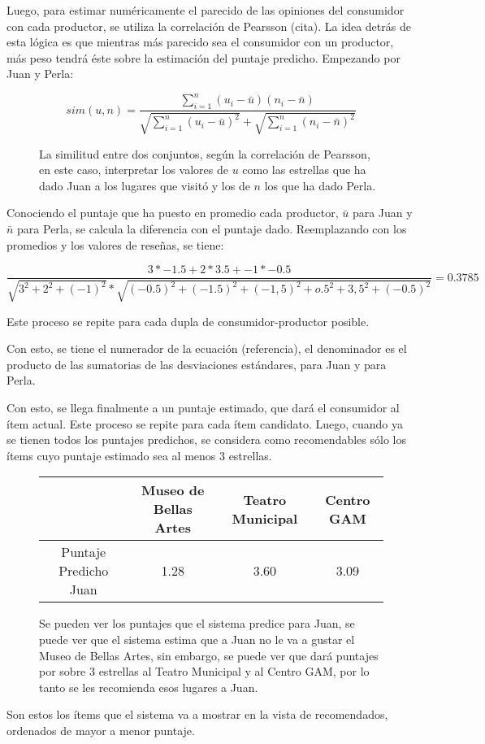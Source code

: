 Luego, para estimar numéricamente el parecido de las opiniones del consumidor con cada productor, se utiliza la correlación de Pearsson (cita). La idea detrás de esta lógica es que mientras más parecido sea el consumidor con un productor, más peso tendrá éste sobre la estimación del puntaje predicho. Empezando por Juan y Perla:

\begin{figure}

\begin{equation}
sim(u,n)=\frac{\sum_{i=1}^{n}(u_i-\bar{u})(n_i-\bar{n})}{\sqrt{\sum_{i=1}^{n}(u_i-\bar{u})^2}+\sqrt{\sum_{i=1}^{n}(n_i-\bar{n})^2}}
\end{equation}
\caption{La similitud entre dos conjuntos, según la correlación de Pearsson, en este caso, interpretar los valores de $u$ como las estrellas que ha dado Juan a los lugares que visitó y los de $n$ los que ha dado Perla. }

\end{figure}
Conociendo el puntaje que ha puesto en promedio cada productor, $\bar{u}$ para Juan y $\bar{n}$ para Perla, se calcula la diferencia con el puntaje dado. Reemplazando con los promedios y los valores de reseñas, se tiene:


\begin{equation}
\frac{3*-1.5 + 2*3.5+-1*-0.5}{\sqrt{3^2+2^2+(-1)^2}*\sqrt{(-0.5)^2+(-1.5)^2+(-1,5)^2+o.5^2+3,5^2+(-0.5)^2}}  = 0.3785
\end{equation}


Este proceso se repite para cada dupla de consumidor-productor posible.

Con esto, se tiene el numerador de la ecuación (referencia), el denominador es el producto de las sumatorias de las desviaciones estándares, para Juan y para Perla.

Con esto, se llega finalmente a un puntaje estimado, que dará el consumidor al ítem actual. Este proceso se repite para cada ítem candidato.
Luego, cuando ya se tienen todos los puntajes predichos, se considera como recomendables sólo los ítems cuyo puntaje estimado sea al menos 3 estrellas.


\begin{figure}
\centering
\begin{adjustbox}{max width=\textwidth}
\begin{tabular}{|c|c|c|c|}
\hline
                &   Museo de Bellas Artes & Teatro Municipal & Centro GAM \\

\hline
Puntaje Predicho Juan          & 1.28  &  3.60  & 3.09  \\
\hline


\end{tabular}
\end{adjustbox}
\caption{Se pueden ver los puntajes que el sistema predice para Juan, se puede ver que el sistema estima que a Juan no le va a gustar el Museo de Bellas Artes, sin embargo, se puede ver que dará puntajes por sobre 3 estrellas al Teatro Municipal y al Centro GAM, por lo tanto se les recomienda esos lugares a Juan.}

\end{figure}


Son estos los ítems que el sistema va a mostrar en la vista de recomendados, ordenados de mayor a menor puntaje. 
